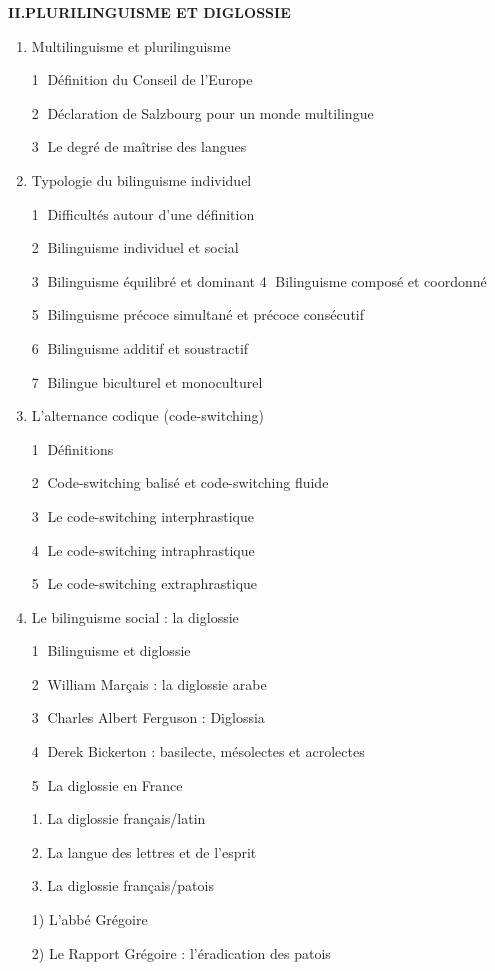 \begin{keybox}
\begin{enumerate}[label=\arabic*.]
\end{enumerate}
\textbf{II.\quad PLURILINGUISME ET DIGLOSSIE}
\begin{enumerate}[label=\arabic*.]
\item Multilinguisme et plurilinguisme\par \textcircled{\scriptsize 1} Définition du Conseil de l’Europe\par \textcircled{\scriptsize 2} Déclaration de Salzbourg pour un monde multilingue\par \textcircled{\scriptsize 3} Le degré de maîtrise des langues
\item Typologie du bilinguisme individuel\par \textcircled{\scriptsize 1} Difficultés autour d’une définition\par \textcircled{\scriptsize 2} Bilinguisme individuel et social\par \textcircled{\scriptsize 3} Bilinguisme équilibré et dominant
\tcbbreak{}
\textcircled{\scriptsize 4} Bilinguisme composé et coordonné\par \textcircled{\scriptsize 5} Bilinguisme précoce simultané et précoce consécutif\par \textcircled{\scriptsize 6} Bilinguisme additif et soustractif\par \textcircled{\scriptsize 7} Bilingue biculturel et monoculturel
\item L’alternance codique (code-switching)\par \textcircled{\scriptsize 1} Définitions\par \textcircled{\scriptsize 2} Code-switching balisé et code-switching fluide\par \textcircled{\scriptsize 3} Le code-switching interphrastique\par \textcircled{\scriptsize 4} Le code-switching intraphrastique\par \textcircled{\scriptsize 5} Le code-switching extraphrastique
\item Le bilinguisme social : la diglossie\par \textcircled{\scriptsize 1} Bilinguisme et diglossie\par \textcircled{\scriptsize 2} William Marçais : la diglossie arabe\par \textcircled{\scriptsize 3} Charles Albert Ferguson : Diglossia\par \textcircled{\scriptsize 4} Derek Bickerton : basilecte, mésolectes et acrolectes\par \textcircled{\scriptsize 5} La diglossie en France\par\hspace*{1em}1. La diglossie français/latin\par\hspace*{1em}2. La langue des lettres et de l’esprit\par\hspace*{1em}3. La diglossie français/patois\par\hspace*{2em}1) L’abbé Grégoire\par\hspace*{2em}2) Le Rapport Grégoire : l’éradication des patois

\end{enumerate}
\end{keybox}
